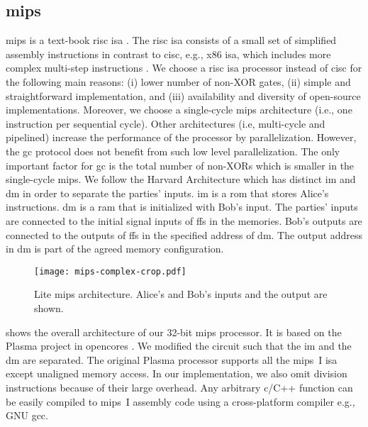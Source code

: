 \subsection{\gls{mips}}\label{ssec:processor-mips}
\gls{mips} is a text-book \acrfull{risc} \acrshort{isa} \cite{kane1992mips}.
The \acrshort{risc} \acrshort{isa} consists of a small set of simplified assembly instructions in contrast to \acrfull{cisc}, e.g., x86 \acrshort{isa}, which includes more complex multi-step instructions \cite{hennessy2012computer}.
We choose a \acrshort{risc} \acrshort{isa} processor instead of \acrshort{cisc} for the following main reasons: (i) lower number of non-XOR gates, (ii) simple and straightforward implementation, and (iii) availability and diversity of open-source implementations.
Moreover, we choose a single-cycle \gls{mips} architecture (i.e., one instruction per sequential cycle).
Other architectures (i.e, multi-cycle and pipelined) increase the performance of the processor by parallelization.
However, the \acrshort{gc} protocol does not benefit from such low level parallelization.
The only important factor for \acrshort{gc} is the total number of non-XORs which is smaller in the single-cycle \gls{mips}.
We follow the Harvard Architecture which has distinct \acrfull{im} and \acrfull{dm} in order to separate the parties' inputs.
\acrshort{im} is a \acrfull{rom} that stores Alice's instructions.
\acrshort{dm} is a \acrfull{ram} that is initialized with Bob's input.
The parties' inputs are connected to the initial signal inputs of \acrshort{ff}s in the memories.
Bob's outputs are connected to the outputs of \acrshort{ff}s in the specified address of \acrshort{dm}.
The output address in \acrshort{dm} is part of the agreed memory configuration.

\begin{figure}
\centering
\texttt{[image: mips-complex-crop.pdf]}
\caption{Lite \gls{mips} architecture.
  Alice's and Bob's inputs and the output are shown.}\label{figure:mips}
\end{figure}

 shows the overall architecture of our 32-bit \gls{mips} processor.
It is based on the Plasma project in opencores \cite{rhoads2006plasma}.
We modified the circuit such that the \acrshort{im} and the \acrshort{dm} are separated.
The original Plasma processor supports all the \gls{mips}~I \acrshort{isa} except unaligned memory access.
In our implementation, we also omit division instructions because of their large overhead.
Any arbitrary \gls{c}/C++ function can be easily compiled to \gls{mips}~I assembly code using a cross-platform compiler e.g., GNU gcc.

